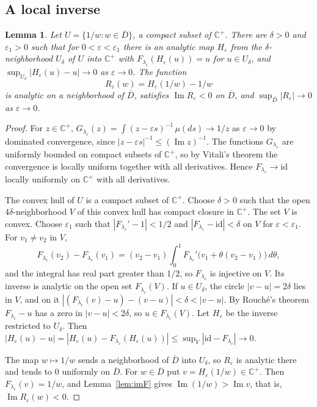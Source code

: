 \documentclass[11pt]{amsart}
\numberwithin{equation}{section}
\newtheorem{lemma}[theorem]{Lemma}
\theoremstyle{definition}
\theoremstyle{remark}
\newcommand{\Cp}{\mathbb C^{+}}
\renewcommand{\Im}{\operatorname{Im}}
\begin{document}
\subsection{A local inverse}

\begin{lemma}\label{lem:inverse}
Let $U=\{1/w:w\in\overline D\}$, a compact subset of $\Cp$. There are $\delta>0$ and $\varepsilon_1>0$ such that for $0<\varepsilon<\varepsilon_1$ there is an analytic map $H_\varepsilon$ from the $\delta$-neighborhood $U_\delta$ of $U$ into $\Cp$ with $F_{\lambda_\varepsilon}(H_\varepsilon(u))=u$ for $u\in U_\delta$, and $\sup_{U_\delta}|H_\varepsilon(u)-u|\to0$ as $\varepsilon\to0$. The function
\[
R_\varepsilon(w)=H_\varepsilon(1/w)-1/w
\]
is analytic on a neighborhood of $\overline D$, satisfies $\Im R_\varepsilon<0$ on $\overline D$, and $\sup_{\overline D}|R_\varepsilon|\to0$ as $\varepsilon\to0$.
\end{lemma}

\begin{proof}
For $z\in\Cp$, $G_{\lambda_\varepsilon}(z)=\int(z-\varepsilon s)^{-1}\,\mu(ds)\to1/z$ as $\varepsilon\to0$ by dominated convergence, since $|z-\varepsilon s|^{-1}\le(\Im z)^{-1}$. The functions $G_{\lambda_\varepsilon}$ are uniformly bounded on compact subsets of $\Cp$, so by Vitali's theorem the convergence is locally uniform together with all derivatives. Hence $F_{\lambda_\varepsilon}\to\mathrm{id}$ locally uniformly on $\Cp$ with all derivatives.

The convex hull of $U$ is a compact subset of $\Cp$. Choose $\delta>0$ such that the open $4\delta$-neighborhood $V$ of this convex hull has compact closure in $\Cp$. The set $V$ is convex. Choose $\varepsilon_1$ such that $|F_{\lambda_\varepsilon}'-1|<1/2$ and $|F_{\lambda_\varepsilon}-\mathrm{id}|<\delta$ on $V$ for $\varepsilon<\varepsilon_1$. For $v_1\ne v_2$ in $V$,
\[
F_{\lambda_\varepsilon}(v_2)-F_{\lambda_\varepsilon}(v_1)=(v_2-v_1)\int_0^1F_{\lambda_\varepsilon}'\bigl(v_1+\theta(v_2-v_1)\bigr)\,d\theta,
\]
and the integral has real part greater than $1/2$, so $F_{\lambda_\varepsilon}$ is injective on $V$. Its inverse is analytic on the open set $F_{\lambda_\varepsilon}(V)$. If $u\in U_\delta$, the circle $|v-u|=2\delta$ lies in $V$, and on it $|(F_{\lambda_\varepsilon}(v)-u)-(v-u)|<\delta<|v-u|$. By Rouch\'e's theorem $F_{\lambda_\varepsilon}-u$ has a zero in $|v-u|<2\delta$, so $u\in F_{\lambda_\varepsilon}(V)$. Let $H_\varepsilon$ be the inverse restricted to $U_\delta$. Then $|H_\varepsilon(u)-u|=|H_\varepsilon(u)-F_{\lambda_\varepsilon}(H_\varepsilon(u))|\le\sup_V|\mathrm{id}-F_{\lambda_\varepsilon}|\to0$.

The map $w\mapsto1/w$ sends a neighborhood of $\overline D$ into $U_\delta$, so $R_\varepsilon$ is analytic there and tends to $0$ uniformly on $\overline D$. For $w\in\overline D$ put $v=H_\varepsilon(1/w)\in\Cp$. Then $F_{\lambda_\varepsilon}(v)=1/w$, and Lemma~\ref{lem:imF} gives $\Im(1/w)>\Im v$, that is, $\Im R_\varepsilon(w)<0$.
\end{proof}
\end{document}
